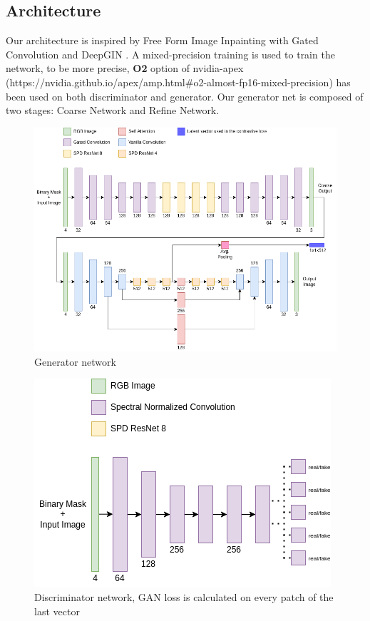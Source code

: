 \documentclass[10pt,twocolumn,letterpaper]{article}
\begin{document}
\subsection{Architecture}
Our architecture is inspired by Free Form Image Inpainting with Gated
Convolution \cite{yu2019free} and DeepGIN \cite{li2020deepgin}.
A mixed-precision training is used to train the network, to be more precise,
\textbf{O2} option of nvidia-apex
(https://nvidia.github.io/apex/amp.html\#o2-almost-fp16-mixed-precision) has
been used on both discriminator and generator.
Our generator net is composed of two stages: Coarse Network and Refine Network.
\begin{figure}
  \includegraphics[width=1\linewidth]{img/generator.png}
  \caption{Generator network}
  \label{fig:generator}
\end{figure}
\begin{figure}
  \includegraphics[width=1\linewidth]{img/discriminator.png}
  \caption{Discriminator network, GAN loss is calculated on every patch of the
  last vector}
  \label{fig:discriminator}
\end{figure}
\end{document}
